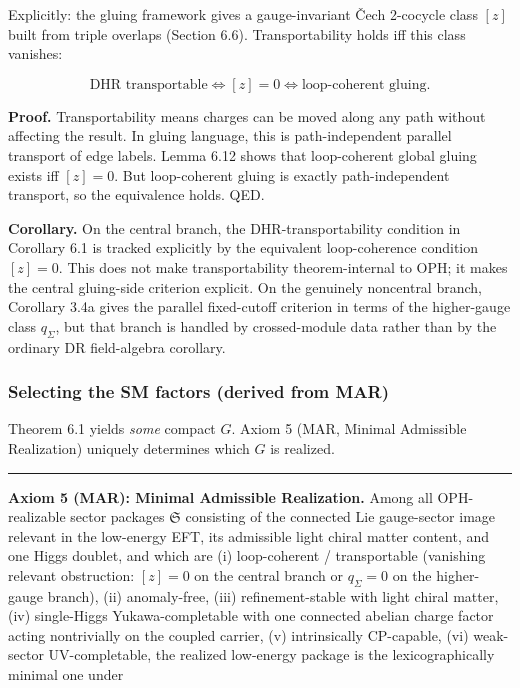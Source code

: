 Explicitly: the gluing framework gives a gauge-invariant \v{C}ech 2-cocycle class \([z]\) built from triple overlaps (Section 6.6). Transportability holds iff this class vanishes:

\[
\text{DHR transportable} \iff [z] = 0 \iff \text{loop-coherent gluing}.
\]

\textbf{Proof.} Transportability means charges can be moved along any path without affecting the result. In gluing language, this is path-independent parallel transport of edge labels. Lemma 6.12 shows that loop-coherent global gluing exists iff \([z] = 0\). But loop-coherent gluing is exactly path-independent transport, so the equivalence holds. QED.

\textbf{Corollary.} On the central branch, the DHR-transportability condition in Corollary 6.1 is tracked explicitly by the equivalent loop-coherence condition \([z]=0\). This does not make transportability theorem-internal to OPH; it makes the central gluing-side criterion explicit. On the genuinely noncentral branch, Corollary 3.4a gives the parallel fixed-cutoff criterion in terms of the higher-gauge class \(q_\Sigma\), but that branch is handled by crossed-module data rather than by the ordinary DR field-algebra corollary.

\subsubsection{Selecting the SM factors (derived from MAR)}\label{62-selecting-the-sm-factors-derived-from-mar}

Theorem 6.1 yields \emph{some} compact \(G\). Axiom 5 (MAR, Minimal Admissible Realization) uniquely determines which \(G\) is realized.

\begin{center}\rule{0.5\linewidth}{0.5pt}\end{center}

\textbf{Axiom 5 (MAR): Minimal Admissible Realization.} Among all OPH-realizable sector packages \(\mathfrak S\) consisting of the connected Lie gauge-sector image relevant in the low-energy EFT, its admissible light chiral matter content, and one Higgs doublet, and which are (i) loop-coherent / transportable (vanishing relevant obstruction: \([z]=0\) on the central branch or \(q_\Sigma=0\) on the higher-gauge branch), (ii) anomaly-free, (iii) refinement-stable with light chiral matter, (iv) single-Higgs Yukawa-completable with one connected abelian charge factor acting nontrivially on the coupled carrier, (v) intrinsically CP-capable, (vi) weak-sector UV-completable, the realized low-energy package is the lexicographically minimal one under

